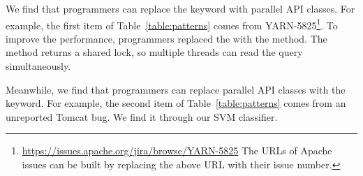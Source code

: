 
We find that programmers can replace the  keyword with parallel API classes. For example, the first item of Table~\ref{table:patterns} comes from YARN-5825\footnote{\url{https://issues.apache.org/jira/browse/YARN-5825} The URLs of Apache issues can be built by replacing the above URL with their issue number.}. To improve the performance, programmers replaced the  with the  method. The method returns a shared lock, so multiple threads can read the query simultaneously.



Meanwhile, we find that programmers can replace parallel API classes with the  keyword. For example, the second item of Table~\ref{table:patterns} comes from an unreported Tomcat bug. We find it through our SVM classifier.%

